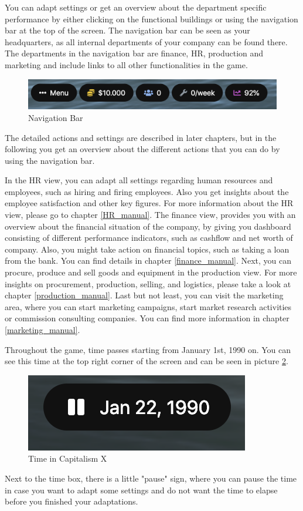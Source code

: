 \documentclass[11pt,titlepage,oneside,openany]{book}
\begin{document}
You can adapt settings or get an overview about the department specific performance by either clicking on the functional buildings or using the navigation bar at the top of the screen. The navigation bar can be seen as your headquarters, as all internal departments of your company can be found there. The departments in the navigation bar are finance, HR, production and marketing and include links to all other functionalities in the game. 
\begin{figure} [!htbp]
    \centering
    \includegraphics [width=\textwidth]{images/navigationBar.png}
    \caption{Navigation Bar}
    \label{fig:navigationBar}
\end{figure} The detailed actions and settings are described in later chapters, but in the following you get an overview about the different actions that you can do by using the navigation bar.

In the HR view, you can adapt all settings regarding human resources and employees, such as hiring and firing employees. Also you get insights about the employee satisfaction and other key figures. For more information about the HR view, please go to chapter \ref{HR_manual}.
The finance view, provides you with an overview about the financial situation of the company, by giving you dashboard consisting of different performance indicators, such as cashflow and net worth of company. Also, you might take action on financial topics, such as taking a loan from the bank. You can find details in chapter \ref{finance_manual}.
Next, you can procure, produce and sell goods and equipment in the production view. For more insights on procurement, production, selling, and logistics, please take a look at chapter \ref{production_manual}. 
Last but not least, you can visit the marketing area, where you can start marketing campaigns, start market research activities or commission consulting companies. You can find more information in chapter \ref{marketing_manual}.

Throughout the game, time passes starting from January 1st, 1990 on. You can see this time at the top right corner of the screen and can be seen in picture \ref{fig:time}.
\begin{figure} [!htbp]
    \centering
    \includegraphics{images/time.png}
    \caption{Time in Capitalism X}
    \label{fig:time}
\end{figure}
Next to the time box, there is a little "pause" sign, where you can pause the time in case you want to adapt some settings and do not want the time to elapse before you finished your adaptations.
\end{document}
